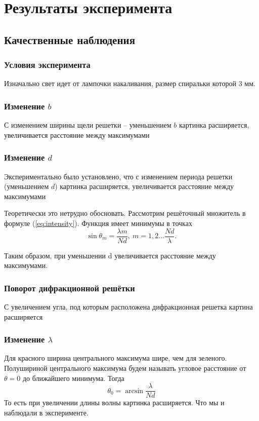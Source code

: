 \newpage
\section{Результаты эксперимента}

\subsection{Качественные наблюдения}
\subsubsection{Условия эксперимента}
Изначально свет идет от лампочки накаливания, размер спиральки которой 3 мм.

\subsubsection{Изменение $b$}
С изменением ширины щели решетки -- уменьшением $b$ картинка расширяется, увеличивается расстояние между максимумами

\subsubsection{Изменение $d$}
Экспериментально было установлено, что с изменением периода решетки (уменьшением $d$) картинка расширяется, увеличивается расстояние между максимумами

Теоретически это нетрудно обосновать. Рассмотрим решёточный множитель в формуле (\ref{eq:intensity}). Функция имеет минимумы в точках 
\begin{equation}
  \sin{\theta_m}=\frac{\lambda m}{Nd},\: m=1,2\dots\frac{Nd}{\lambda}.
\end{equation}

Таким образом, при уменьшении d увеличивается расстояние между максимумами.

\subsubsection{Поворот дифракционной решётки}
С увеличением угла, под которым расположена дифракционная решетка картина расширяется


\subsubsection{Изменение $\lambda$}
Для красного ширина центрального максимума шире, чем для зеленого.
Полушириной центрального максимума будем называть угловое расстояние от $\theta=0$ до ближайшего минимума.
Тогда
\begin{equation}
 	\theta_0=\arcsin\frac{\lambda}{Nd}
 \end{equation} 
 То есть при увеличении длины волны картинка расширяется. Что мы и наблюдали в эксперименте.

